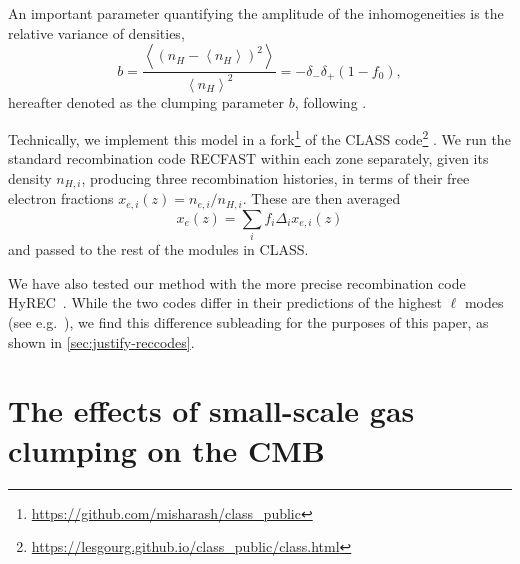 An important parameter quantifying the amplitude of the inhomogeneities is the relative variance of densities,
\begin{equation}
b=\frac{\left\langle \left( n_H - \left\langle n_H \right\rangle \right)^2 \right\rangle}{\left\langle n_H \right\rangle^2} = -\delta_- \delta_+ \left( 1-f_0 \right),
\label{eq:b-def}
\end{equation}
hereafter denoted as the clumping parameter $b$, following \citet{JP20}.

Technically, we implement this model in a fork\footnote{\url{https://github.com/misharash/class\_public}} of the CLASS code\footnote{\url{https://lesgourg.github.io/class_public/class.html}} \citep{CLASS}. 
We run the standard recombination code RECFAST \citep{recfast1,recfast2,recfast3} within each zone separately, given its density $n_{H,i}$, producing three recombination histories, in terms of their free electron fractions $x_{e,i}\left( z \right)=n_{e,i}/n_{H,i}$.
These are then averaged 
\begin{equation}
x_e\left( z \right) = \sum_i f_i\Delta_i x_{e,i}\left( z \right)
\end{equation}
and passed to the rest of the modules in CLASS.

We have also tested our method with the more precise recombination code HyREC~\citep{hyrec2011}. 
While the two codes differ in their predictions of the highest $\ell$ modes (see e.g.~\citet{hyrec2}), we find this difference subleading for the purposes of this paper, as shown in \cref{sec:justify-reccodes}.

\section{The effects of small-scale gas clumping on the CMB}
\label{sec:effects}

